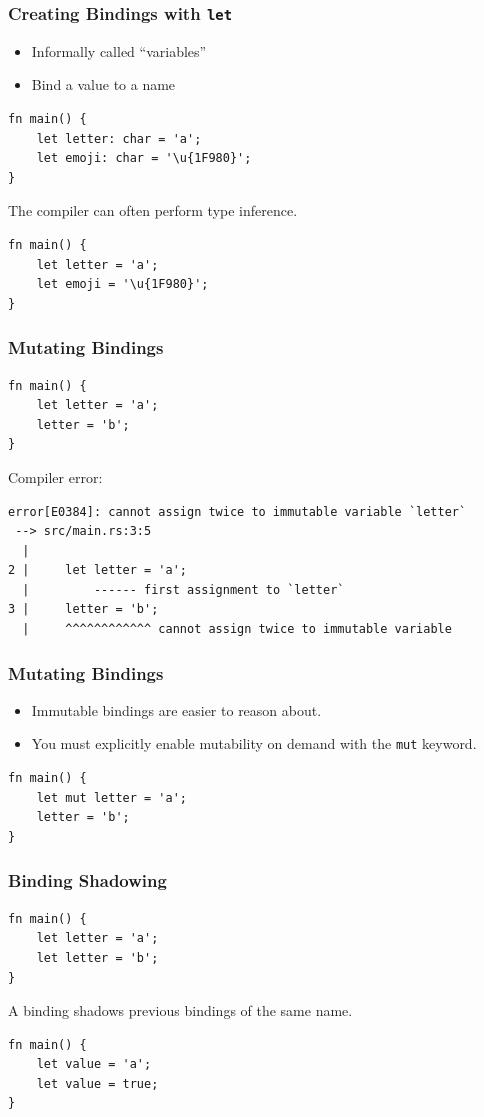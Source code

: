 \begin{frame}[fragile]
    \frametitle{Creating Bindings with \texttt{let}}
    \begin{itemize}
        \item Informally called ``variables''
        \item Bind a value to a name
    \end{itemize}
    \pause
    \vfill
    \begin{verbatim}
fn main() {
    let letter: char = 'a';
    let emoji: char = '\u{1F980}';
}
    \end{verbatim}
    \pause
    \vfill
    The compiler can often perform type inference.
    \pause
    \vfill
    \begin{verbatim}
fn main() {
    let letter = 'a';
    let emoji = '\u{1F980}';
}
    \end{verbatim}
\end{frame}

\begin{frame}[fragile]
    \frametitle{Mutating Bindings}
    \begin{verbatim}
fn main() {
    let letter = 'a';
    letter = 'b';
}
    \end{verbatim}
    \pause
    \vfill
    Compiler error:
    \begin{verbatim}
error[E0384]: cannot assign twice to immutable variable `letter`
 --> src/main.rs:3:5
  |
2 |     let letter = 'a';
  |         ------ first assignment to `letter`
3 |     letter = 'b';
  |     ^^^^^^^^^^^^ cannot assign twice to immutable variable
    \end{verbatim}
\end{frame}

\begin{frame}[fragile]
    \frametitle{Mutating Bindings}
    \begin{itemize}
        \item Immutable bindings are easier to reason about.
        \item You must explicitly enable mutability on demand with the \texttt{mut} keyword.
    \end{itemize}
    \pause
    \vfill
    \begin{verbatim}
fn main() {
    let mut letter = 'a';
    letter = 'b';
}
    \end{verbatim}
\end{frame}

\begin{frame}[fragile]
    \frametitle{Binding Shadowing}
    \begin{verbatim}
fn main() {
    let letter = 'a';
    let letter = 'b';
}
    \end{verbatim}
    \pause
    \vfill
    A binding shadows previous bindings of the same name.
    \pause
    \vfill
    \begin{verbatim}
fn main() {
    let value = 'a';
    let value = true;
}
    \end{verbatim}
\end{frame}

